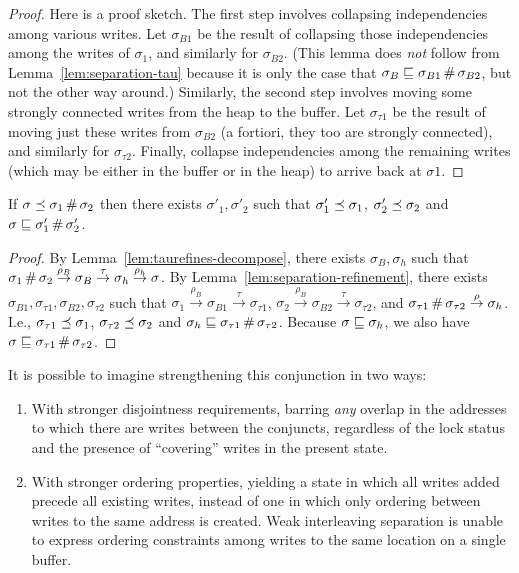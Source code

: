 \documentclass[11pt]{article}
\begin{document}
\begin{proof}
	Here is a proof sketch. The first step involves collapsing independencies among various writes. Let $\sigma_{B1}$ be the result of collapsing those independencies among the writes of $\sigma_1$, and similarly for $\sigma_{B2}$. (This lemma does \emph{not} follow from Lemma~\ref{lem:separation-tau} because it is only the case that $\sigma_B \sqsubseteq \sigma_{B1} \operatorname{\#} \sigma_{B2}$, but not the other way around.) Similarly, the second step involves moving some strongly connected writes from the heap to the buffer. Let $\sigma_{\tau1}$ be the result of moving just these writes from $\sigma_{B2}$ (a fortiori, they too are strongly connected), and similarly for $\sigma_{\tau2}$. Finally, collapse independencies among the remaining writes (which may be either in the buffer or in the heap) to arrive back at $\sigma1$. 
\end{proof}

\begin{lemma}
	\label{lem:separation-refinement}
	If $\sigma \preceq \sigma_1 \operatorname{\#} \sigma_2$ then there exists $\sigma'_1,\sigma'_2$ such that $\sigma'_1 \preceq \sigma_1$, $\sigma'_2 \preceq \sigma_2$ and $\sigma \sqsubseteq \sigma'_1 \operatorname{\#} \sigma'_2$. 
\end{lemma}

\begin{proof}
	By Lemma~\ref{lem:taurefines-decompose}, there exists $\sigma_B,\sigma_h$ such that $\sigma_1 \operatorname{\#} \sigma_2 \stackrel{\rho_B}{\rightarrow} \sigma_B \stackrel{\tau}{\rightarrow} \sigma_h \stackrel{\rho_h}{\rightarrow} \sigma$. By Lemma~\ref{lem:separation-refinement}, there exists $\sigma_{B1},\sigma_{\tau1},\sigma_{B2},\sigma_{\tau2}$ such that $\sigma_{1} \stackrel{\rho_B}{\rightarrow} \sigma_{B1} \stackrel{\tau}{\rightarrow} \sigma_{\tau1}$, $\sigma_{2} \stackrel{\rho_B}{\rightarrow} \sigma_{B2} \stackrel{\tau}{\rightarrow} \sigma_{\tau2}$, and $\sigma_{\tau1} \operatorname{\#} \sigma_{\tau2} \stackrel{\rho}{\rightarrow} \sigma_h$. I.e., $\sigma_{\tau1} \preceq \sigma_1$, $\sigma_{\tau2} \preceq \sigma_2$ and $\sigma_h \sqsubseteq \sigma_{\tau1} \operatorname{\#} \sigma_{\tau2}$. Because $\sigma \sqsubseteq \sigma_h$, we also have $\sigma \sqsubseteq \sigma_{\tau1} \operatorname{\#} \sigma_{\tau2}$. 
\end{proof}

It is possible to imagine strengthening this conjunction in two ways: \begin{enumerate}
	\item With stronger disjointness requirements, barring \emph{any} overlap in the addresses to which there are writes between the conjuncts, regardless of the lock status and the presence of ``covering'' writes in the present state.  
	
	\item With stronger ordering properties, yielding a state in which all writes added precede all existing writes, instead of one in which only ordering between writes to the same address is created. Weak interleaving separation is unable to express ordering constraints among writes to the same location on a single buffer. 
\end{enumerate}
\end{document}
